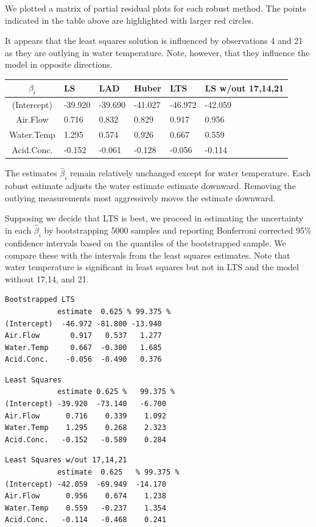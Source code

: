 \documentclass{homework}
\begin{document}
\begin{solution}
\begin{minipage}{.5\textwidth}
We plotted a matrix of partial residual plots for each robust method.  The
points indicated in the table above are highlighted with larger red circles.

It appears that the least squares solution is influenced by observations 4 and 21
as they are outlying in water temperature.  Note, however, that they influence the
model in opposite directions.  
\end{minipage}
\begin{tabular}{c | l l l l l}
$\beta_i$  & LS & LAD & Huber & LTS & LS w/out 17,14,21\\\hline
(Intercept)& -39.920& -39.690& -41.027& -46.972& -42.059\\
Air.Flow   &   0.716&   0.832&   0.829&   0.917&   0.956\\
Water.Temp &   1.295&   0.574&   0.926&   0.667&   0.559\\
Acid.Conc. &  -0.152&  -0.061&  -0.128&  -0.056&  -0.114\\\hline
\end{tabular}

The estimates $\widehat \beta_i$ remain relatively unchanged except for water temperature.  Each robust estimate adjusts the water estimate estimate downward. Removing the outlying measurements most aggressively moves the estimate downward. 

Supposing we decide that LTS is best, we proceed in estimating the uncertainty in each $\widehat \beta_i$ by bootstrapping 5000 samples and reporting Bonferroni corrected 95\% confidence intervals based on the quantiles of the bootstrapped sample. We compare these with the intervals from the least squares estimates. Note that water temperature is significant in least squares but not in LTS and the model without 17,14, and 21.

\begin{verbatim}
Bootstrapped LTS
            estimate  0.625 % 99.375 %
(Intercept)  -46.972 -81.800 -13.940
Air.Flow       0.917   0.537   1.277
Water.Temp     0.667  -0.300   1.685
Acid.Conc.    -0.056  -0.490   0.376
\end{verbatim}

\begin{verbatim}
Least Squares
            estimate 0.625 %   99.375 %
(Intercept) -39.920  -73.140   -6.700
Air.Flow      0.716    0.339    1.092
Water.Temp    1.295    0.268    2.323
Acid.Conc.   -0.152   -0.589    0.284
\end{verbatim}

\begin{verbatim}
Least Squares w/out 17,14,21
            estimate  0.625   % 99.375 %
(Intercept) -42.059  -69.949  -14.170
Air.Flow      0.956    0.674    1.238
Water.Temp    0.559   -0.237    1.354
Acid.Conc.   -0.114   -0.468    0.241
\end{verbatim}

\end{solution}
\end{document}
